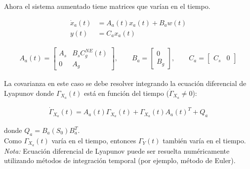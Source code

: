 Ahora el sistema aumentado tiene matrices que varían en el tiempo.

\begin{align*}
    \dot{x}_a(t) &= A_a(t)x_a(t) + B_a w(t)\\
    y(t) &= C_a x_a(t)
\end{align*}

\begin{align*}
    A_a(t) = \begin{bmatrix}
        A_s & B_s C_g^{NE}(t) \\
        0 & A_g
    \end{bmatrix}, \qquad
    B_a = \begin{bmatrix}
        0 \\
        B_g
    \end{bmatrix}, \qquad 
    C_a = \begin{bmatrix}
        C_s & 0
    \end{bmatrix}
\end{align*}

La covarianza en este caso se debe resolver integrando la ecuación diferencial de Lyapunov donde $\Gamma_{X_a}(t)$ está en función del tiempo ($\dot{\Gamma}_{X_a} \neq 0$):

\begin{align*}
    \dot{\Gamma}_{X_{a}}(t) = A_a(t) \Gamma_{X_a}(t) + \Gamma_{X_a}(t) A_a(t)^T + Q_a
\end{align*}

\noindent donde $Q_a = B_a \left( S_0 \right) B_a^T$.\\

Como $\Gamma_{X_a}(t)$ varía en el tiempo, entonces $ \Gamma_Y(t)$ también varía en el tiempo.\\

\noindent \emph{Nota:} Ecuación diferencial de Lyapunov puede ser resuelta numéricamente utilizando métodos de integración temporal (por ejemplo, método de Euler).

